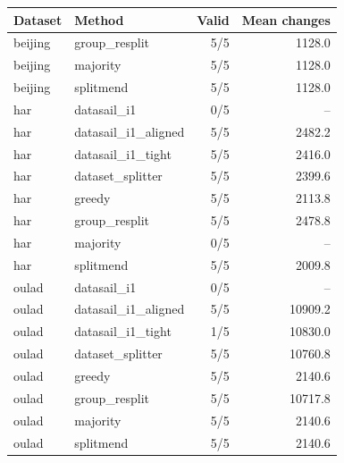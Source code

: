 \begin{tabular}{llrr}
\hline
Dataset & Method & Valid & Mean changes \\
\hline
beijing & group\_resplit & 5/5 & 1128.0 \\
beijing & majority & 5/5 & 1128.0 \\
beijing & splitmend & 5/5 & 1128.0 \\
har & datasail\_i1 & 0/5 & -- \\
har & datasail\_i1\_aligned & 5/5 & 2482.2 \\
har & datasail\_i1\_tight & 5/5 & 2416.0 \\
har & dataset\_splitter & 5/5 & 2399.6 \\
har & greedy & 5/5 & 2113.8 \\
har & group\_resplit & 5/5 & 2478.8 \\
har & majority & 0/5 & -- \\
har & splitmend & 5/5 & 2009.8 \\
oulad & datasail\_i1 & 0/5 & -- \\
oulad & datasail\_i1\_aligned & 5/5 & 10909.2 \\
oulad & datasail\_i1\_tight & 1/5 & 10830.0 \\
oulad & dataset\_splitter & 5/5 & 10760.8 \\
oulad & greedy & 5/5 & 2140.6 \\
oulad & group\_resplit & 5/5 & 10717.8 \\
oulad & majority & 5/5 & 2140.6 \\
oulad & splitmend & 5/5 & 2140.6 \\
\hline
\end{tabular}
